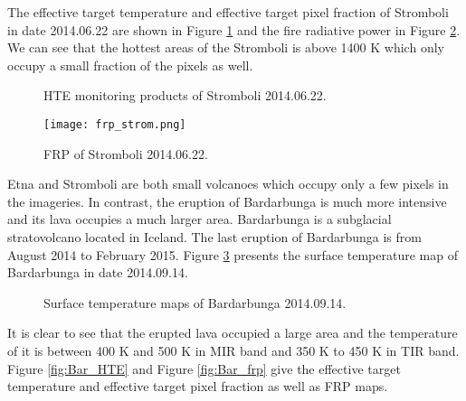 \noindent The effective target temperature and effective target pixel fraction of Stromboli in date 2014.06.22 are shown in Figure \ref{fig:Strom_HTE} and the fire radiative power in Figure \ref{fig:Strom_frp}. We can see that the hottest areas of the Stromboli is above 1400 K which only occupy a small fraction of the pixels as well.\\

\begin{figure}[!htbp]
\centering
{}
\hspace{0.1in}
\caption{HTE monitoring products of Stromboli 2014.06.22.}
\label{fig:Strom_HTE}
\end{figure}

\begin{figure}[!htbp]
\centering
\texttt{[image: frp\_strom.png]}
\caption{FRP of Stromboli 2014.06.22.}
\label{fig:Strom_frp}
\end{figure}

\noindent Etna and Stromboli are both small volcanoes which occupy only a few pixels in the imageries. In contrast, the eruption of Bardarbunga is much more intensive and its lava occupies a much larger area. Bardarbunga is a subglacial stratovolcano located in Iceland. The last eruption of Bardarbunga is from August 2014 to February 2015. Figure \ref{fig:Bar_sur_tem} presents the surface temperature map of Bardarbunga in date 2014.09.14.\\

\begin{figure}
\centering
{}
\hspace{0.1in}
\caption{Surface temperature maps of Bardarbunga 2014.09.14.}
\label{fig:Bar_sur_tem}
\end{figure}

\noindent It is clear to see that the erupted lava occupied a large area and the temperature of it is between 400 K and 500 K in MIR band and 350 K to 450 K in TIR band. Figure \ref{fig:Bar_HTE} and Figure \ref{fig:Bar_frp} give the effective target temperature and effective target pixel fraction as well as FRP maps.\

